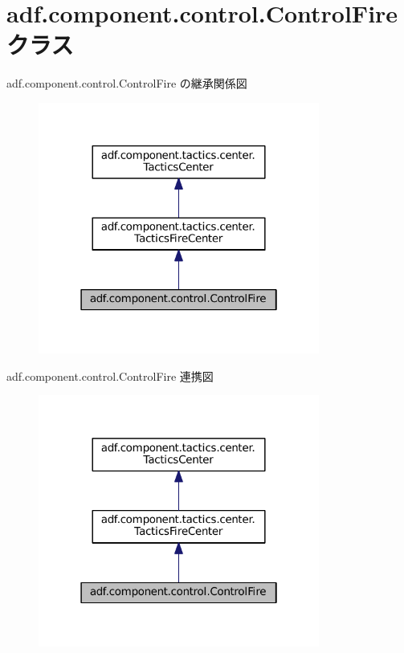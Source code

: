 \hypertarget{classadf_1_1component_1_1control_1_1ControlFire}{}\section{adf.\+component.\+control.\+Control\+Fire クラス}
\label{classadf_1_1component_1_1control_1_1ControlFire}


adf.\+component.\+control.\+Control\+Fire の継承関係図
\nopagebreak
\begin{figure}[H]
\begin{center}
\leavevmode
\includegraphics[width=262pt]{classadf_1_1component_1_1control_1_1ControlFire__inherit__graph}
\end{center}
\end{figure}


adf.\+component.\+control.\+Control\+Fire 連携図
\nopagebreak
\begin{figure}[H]
\begin{center}
\leavevmode
\includegraphics[width=262pt]{classadf_1_1component_1_1control_1_1ControlFire__coll__graph}
\end{center}
\end{figure}
